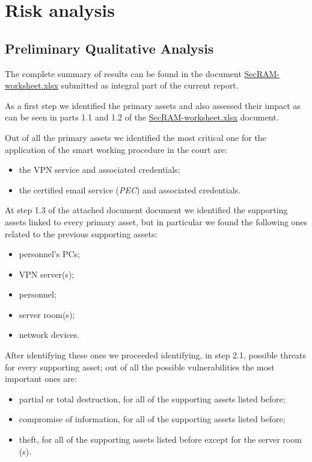 \section{Risk analysis}
\label{sec:risk-analysis}

\subsection{Preliminary Qualitative Analysis}

The complete summary of results can be found in the document  \url{SecRAM-worksheet.xlsx} submitted as integral part of the current report.

As a first step we identified the primary assets and also assessed their impact as can be seen in parts 1.1 and 1.2 of the \url{SecRAM-worksheet.xlsx} document. 

Out of all the primary assets we identified the most critical one for the application of the smart working procedure in the court are:

\begin{itemize}
    \item the VPN service and associated credentials;
    \item the certified email service (\textit{PEC}) and associated credentials.
\end{itemize}

At step 1.3 of the attached document document we identified the supporting assets linked to every primary asset, but in particular we found the following ones related to the previous supporting assets:

\begin{itemize}
    \item personnel's PCs;
    \item VPN server(s);
    \item personnel;
    \item server room(s);
    \item network devices.
\end{itemize}

After identifying these ones we proceeded identifying, in step 2.1, possible threats for every supporting asset; out of all the possible vulnerabilities the most important ones are:

\begin{itemize}
    \item partial or total destruction, for all of the supporting assets listed before;
    \item compromise of information, for all of the supporting assets listed before;
    \item theft, for all of the supporting assets listed before except for the server room (s).
\end{itemize}

